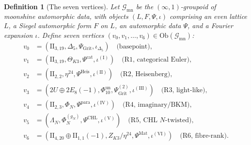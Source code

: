 \documentclass[11pt]{article}
\newtheorem{definition}[theorem]{Definition}
\begin{document}
\begin{definition}[The seven vertices]
\label{def:seven-vertices}
Let $\mathcal G_{\mathrm{mn}}$ be the $(\infty, 1)$-groupoid of
moonshine automorphic data, with objects
$(L, F, \Psi, \iota)$ comprising an even lattice $L$, a Siegel
automorphic form $F$ on $L$, an automorphic data
$\Psi$, and a Fourier expansion $\iota$. Define seven vertices
$(v_0, v_1, \ldots, v_6) \in \mathrm{Ob}(\mathcal G_{\mathrm{mn}})$:
\begin{align*}
v_0 &= (\mathrm{II}_{3,19}, \Delta_5, \Psi_{\mathrm{Grit}},
\iota_{\Delta_5}) \quad \text{(basepoint)}, \\
v_1 &= (\mathrm{II}_{3,19}, \Theta_{K3}, \Psi^{\mathrm{cat}},
\iota^{(\mathrm I)})  \quad \text{(R$1$, categorical Euler)}, \\
v_2 &= (\mathrm{II}_{2,2}, \eta^{24}, \Psi^{\mathrm{Heis}},
\iota^{(\mathrm{II})})  \quad \text{(R$2$, Heisenberg)}, \\
v_3 &= (2U \oplus 2E_8(-1), \Phi_{10}^{\mathrm{un}},
\Psi^{(2)}_{\mathrm{Grit}},
\iota^{(\mathrm{III})})  \quad \text{(R$3$, light-like)}, \\
v_4 &= (\mathrm{II}_{2,3}, \Phi_N, \Psi^{\mathrm{para}},
\iota^{(\mathrm{IV})})  \quad \text{(R$4$, imaginary/BKM)}, \\
v_5 &= (\Lambda_N, \Phi_N^{(g_N)}, \Psi^{\mathrm{CHL}},
\iota^{(\mathrm V)})  \quad \text{(R$5$, CHL $N$-twisted)}, \\
v_6 &= (\mathrm{II}_{4,20} \oplus \mathrm{II}_{1,1}(-1),
Z_{K3}/\eta^{24}, \Psi^{\mathrm{Mat}},
\iota^{(\mathrm{VI})})  \quad \text{(R$6$, fibre-rank)}.
\end{align*}
\end{definition}
\end{document}
